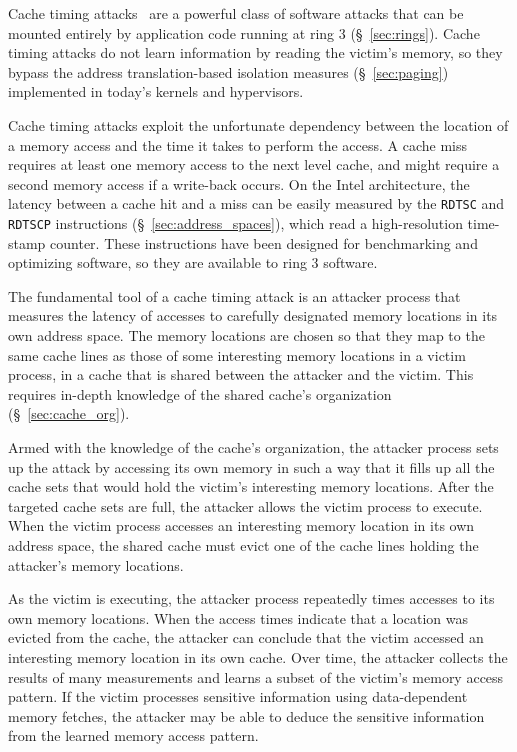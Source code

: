 \label{sec:cache_timing}

Cache timing attacks~\cite{banescu2011cache} are a powerful class of software
attacks that can be mounted entirely by application code running at ring 3
(\S~\ref{sec:rings}). Cache timing attacks do not learn information by reading
the victim's memory, so they bypass the address translation-based isolation
measures (\S~\ref{sec:paging}) implemented in today's kernels and hypervisors.



Cache timing attacks exploit the unfortunate dependency between the location of
a memory access and the time it takes to perform the access. A cache miss
requires at least one memory access to the next level cache, and might require
a second memory access if a write-back occurs. On the Intel architecture, the
latency between a cache hit and a miss can be easily measured by the
\texttt{RDTSC} and \texttt{RDTSCP} instructions (\S~\ref{sec:address_spaces}),
which read a high-resolution time-stamp counter. These instructions have been
designed for benchmarking and optimizing software, so they are available to
ring 3 software.

The fundamental tool of a cache timing attack is an attacker process that
measures the latency of accesses to carefully designated memory locations in
its own address space. The memory locations are chosen so that they map to
the same cache lines as those of some interesting memory locations in a victim
process, in a cache that is shared between the attacker and the victim. This
requires in-depth knowledge of the shared cache's organization
(\S~\ref{sec:cache_org}).

Armed with the knowledge of the cache's organization, the attacker process
sets up the attack by accessing its own memory in such a way that it fills up
all the cache sets that would hold the victim's interesting memory locations.
After the targeted cache sets are full, the attacker allows the victim process
to execute. When the victim process accesses an interesting memory location in
its own address space, the shared cache must evict one of the cache lines
holding the attacker's memory locations.

As the victim is executing, the attacker process repeatedly times accesses to
its own memory locations. When the access times indicate that a location was
evicted from the cache, the attacker can conclude that the victim accessed an
interesting memory location in its own cache. Over time, the attacker collects
the results of many measurements and learns a subset of the victim's memory
access pattern. If the victim processes sensitive information using
data-dependent memory fetches, the attacker may be able to deduce the sensitive
information from the learned memory access pattern.


